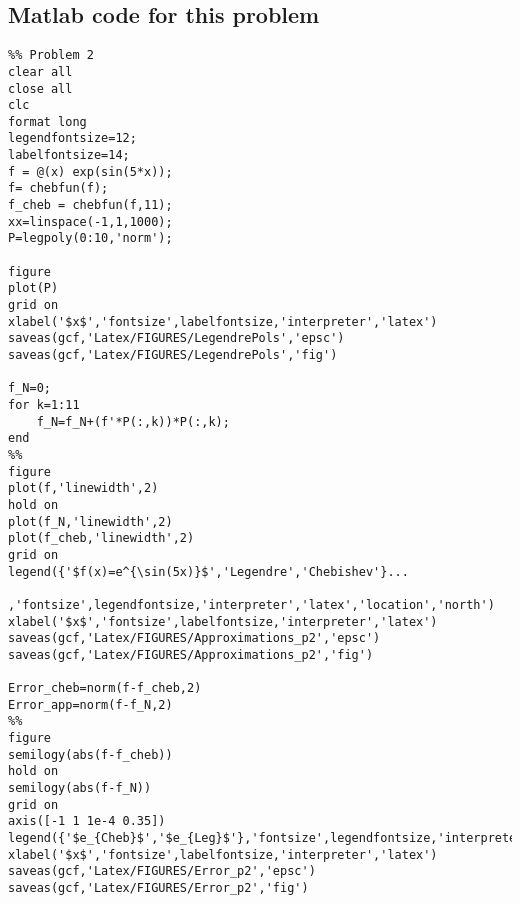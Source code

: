 \subsection*{Matlab code for this problem}
\begin{verbatim}
%% Problem 2
clear all
close all
clc
format long
legendfontsize=12;
labelfontsize=14;
f = @(x) exp(sin(5*x));
f= chebfun(f);
f_cheb = chebfun(f,11);
xx=linspace(-1,1,1000);
P=legpoly(0:10,'norm');

figure
plot(P)
grid on
xlabel('$x$','fontsize',labelfontsize,'interpreter','latex')
saveas(gcf,'Latex/FIGURES/LegendrePols','epsc')
saveas(gcf,'Latex/FIGURES/LegendrePols','fig')

f_N=0;
for k=1:11
    f_N=f_N+(f'*P(:,k))*P(:,k);
end
%%
figure
plot(f,'linewidth',2)
hold on
plot(f_N,'linewidth',2)
plot(f_cheb,'linewidth',2)
grid on
legend({'$f(x)=e^{\sin(5x)}$','Legendre','Chebishev'}...
    ,'fontsize',legendfontsize,'interpreter','latex','location','north')
xlabel('$x$','fontsize',labelfontsize,'interpreter','latex')
saveas(gcf,'Latex/FIGURES/Approximations_p2','epsc')
saveas(gcf,'Latex/FIGURES/Approximations_p2','fig')

Error_cheb=norm(f-f_cheb,2)
Error_app=norm(f-f_N,2)
%%
figure
semilogy(abs(f-f_cheb))
hold on
semilogy(abs(f-f_N))
grid on
axis([-1 1 1e-4 0.35])
legend({'$e_{Cheb}$','$e_{Leg}$'},'fontsize',legendfontsize,'interpreter','latex')
xlabel('$x$','fontsize',labelfontsize,'interpreter','latex')
saveas(gcf,'Latex/FIGURES/Error_p2','epsc')
saveas(gcf,'Latex/FIGURES/Error_p2','fig')

\end{verbatim}